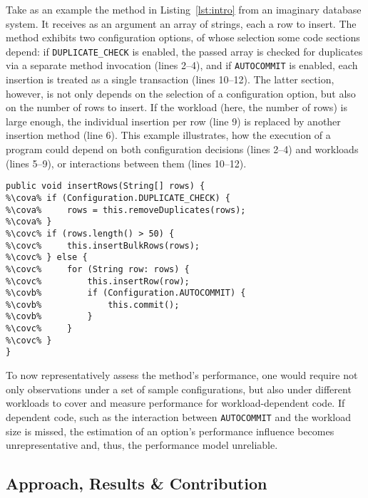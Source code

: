 Take as an example the method in Listing~\ref{lst:intro} from an imaginary database system. It receives as an argument an array of strings, each a row to insert. The method exhibits two configuration options, of whose selection some code sections depend: if \texttt{DUPLICATE\_CHECK} is enabled, the passed array is checked for duplicates via a separate method invocation (lines 2--4), and if \texttt{AUTOCOMMIT} is enabled, each insertion is treated as a single transaction (lines 10--12). The latter section, however, is not only depends on the selection of a configuration option, but also on the number of rows to insert. If the workload (here, the number of rows) is large enough, the individual insertion per row (line 9) is replaced by another insertion method (line 6). This example illustrates, how the execution of a program could depend on both configuration decisions (lines 2--4) and workloads (lines 5--9), or interactions between them (lines 10--12).
\begin{lstlisting}[caption={Illustrative code example of option-dependent code, workload-dependent code, and interaction-dependent code.},label=lst:intro, escapechar=\%,float]
public void insertRows(String[] rows) {
%\cova%	if (Configuration.DUPLICATE_CHECK) {
%\cova%		rows = this.removeDuplicates(rows);
%\cova%	}
%\covc%	if (rows.length() > 50) {
%\covc%		this.insertBulkRows(rows);
%\covc%	} else {
%\covc%		for (String row: rows) {
%\covc%			this.insertRow(row);
%\covb%			if (Configuration.AUTOCOMMIT) {
%\covb%				this.commit();
%\covb%			}	
%\covc%		}
%\covc%	}
}
\end{lstlisting}
To now representatively assess the method's performance, one would require not only observations under a set of sample configurations, but also under different workloads to cover and measure performance for workload-dependent code. If dependent code, such as the interaction between \texttt{AUTOCOMMIT} and the workload size is missed, the estimation of an option's performance influence becomes unrepresentative and, thus, the performance model unreliable.

\subsection*{Approach, Results \& Contribution}

